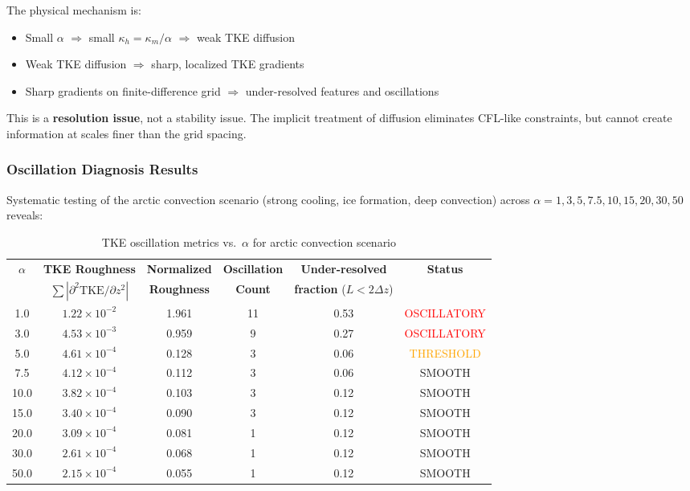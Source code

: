 \documentclass[12pt,letterpaper]{article}
\newcommand{\TKE}{\mathrm{TKE}}
\begin{document}
The physical mechanism is:
\begin{itemize}
\item Small $\alpha$ $\Rightarrow$ small $\kappa_h = \kappa_m / \alpha$ $\Rightarrow$ weak TKE diffusion
\item Weak TKE diffusion $\Rightarrow$ sharp, localized TKE gradients
\item Sharp gradients on finite-difference grid $\Rightarrow$ under-resolved features and oscillations
\end{itemize}

This is a \textbf{resolution issue}, not a stability issue. The implicit treatment of diffusion eliminates CFL-like constraints, but cannot create information at scales finer than the grid spacing.

\subsubsection{Oscillation Diagnosis Results}

Systematic testing of the arctic convection scenario (strong cooling, ice formation, deep convection) across $\alpha = 1, 3, 5, 7.5, 10, 15, 20, 30, 50$ reveals:

\begin{table}[ht]
\centering
\caption{TKE oscillation metrics vs.\ $\alpha$ for arctic convection scenario}
\label{tab:alpha_oscillations}
\small
\begin{tabular}{cccccc}
\toprule
$\alpha$ & \textbf{TKE Roughness} & \textbf{Normalized} & \textbf{Oscillation} & \textbf{Under-resolved} & \textbf{Status} \\
 & $\sum |\partial^2 \TKE/\partial z^2|$ & \textbf{Roughness} & \textbf{Count} & \textbf{fraction} ($L<2\Delta z$) &  \\
\midrule
1.0  & $1.22 \times 10^{-2}$ & 1.961 & 11 & 0.53 & \textcolor{red}{OSCILLATORY} \\
3.0  & $4.53 \times 10^{-3}$ & 0.959 & 9  & 0.27 & \textcolor{red}{OSCILLATORY} \\
5.0  & $4.61 \times 10^{-4}$ & 0.128 & 3  & 0.06 & \textcolor{orange}{THRESHOLD} \\
7.5  & $4.12 \times 10^{-4}$ & 0.112 & 3  & 0.06 & \textcolor{green!60!black}{SMOOTH} \\
10.0 & $3.82 \times 10^{-4}$ & 0.103 & 3  & 0.12 & \textcolor{green!60!black}{SMOOTH} \\
15.0 & $3.40 \times 10^{-4}$ & 0.090 & 3  & 0.12 & \textcolor{green!60!black}{SMOOTH} \\
20.0 & $3.09 \times 10^{-4}$ & 0.081 & 1  & 0.12 & \textcolor{green!60!black}{SMOOTH} \\
30.0 & $2.61 \times 10^{-4}$ & 0.068 & 1  & 0.12 & \textcolor{green!60!black}{SMOOTH} \\
50.0 & $2.15 \times 10^{-4}$ & 0.055 & 1  & 0.12 & \textcolor{green!60!black}{SMOOTH} \\
\bottomrule
\end{tabular}
\end{table}
\end{document}
